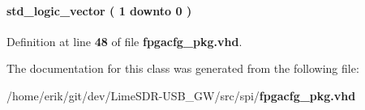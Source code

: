 \paragraph[{wfm\+\_\+smpl\+\_\+width}]{ {\bfseries \textcolor{comment}{std\+\_\+logic\+\_\+vector}\textcolor{vhdlchar}{ }\textcolor{vhdlchar}{(}\textcolor{vhdlchar}{ }\textcolor{vhdlchar}{ } \textcolor{vhdldigit}{1} \textcolor{vhdlchar}{ }\textcolor{keywordflow}{downto}\textcolor{vhdlchar}{ }\textcolor{vhdlchar}{ } \textcolor{vhdldigit}{0} \textcolor{vhdlchar}{ }\textcolor{vhdlchar}{)}\textcolor{vhdlchar}{ }} \hspace{0.3cm}{\ttfamily [Record]}}\label{classfpgacfg__pkg_ab7dbfadba27ec9f07c99759b4c55beea}


Definition at line {\bf 48} of file {\bf fpgacfg\+\_\+pkg.\+vhd}.



The documentation for this class was generated from the following file\+:\begin{DoxyCompactItemize}
\item 
/home/erik/git/dev/\+Lime\+S\+D\+R-\/\+U\+S\+B\+\_\+\+G\+W/src/spi/{\bf fpgacfg\+\_\+pkg.\+vhd}\end{DoxyCompactItemize}
